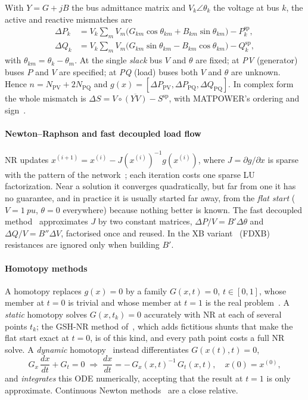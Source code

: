 \documentclass[sigconf,nonacm]{acmart}
\newcommand{\xo}{x^{(0)}}
\begin{document}
With $Y=G+jB$ the bus admittance matrix and $V_k\angle\theta_k$ the voltage at bus $k$, the active and
reactive mismatches are
\begin{align}
  \Delta P_k &= V_k \sum_{m} V_m\bigl(G_{km}\cos\theta_{km} + B_{km}\sin\theta_{km}\bigr) - P_k^{\mathrm{sp}}, \label{eq:p}\\
  \Delta Q_k &= V_k \sum_{m} V_m\bigl(G_{km}\sin\theta_{km} - B_{km}\cos\theta_{km}\bigr) - Q_k^{\mathrm{sp}}, \label{eq:q}
\end{align}
with $\theta_{km}=\theta_k-\theta_m$. At the single \emph{slack} bus $V$ and $\theta$ are fixed; at
\emph{PV} (generator) buses $P$ and $V$ are specified; at \emph{PQ} (load) buses both $V$ and $\theta$
are unknown. Hence $n=N_{\mathrm{PV}}+2N_{\mathrm{PQ}}$ and
$g(x)=[\Delta P_{\mathrm{PV}},\Delta P_{\mathrm{PQ}},\Delta Q_{\mathrm{PQ}}]$. In complex form the whole
mismatch is $\Delta S = V\circ\overline{(YV)} - S^{\mathrm{sp}}$, with MATPOWER's ordering and
sign~\cite{matpower}.

\paragraph{Newton--Raphson and fast decoupled load flow}
NR updates $x^{(i+1)} = x^{(i)} - J(x^{(i)})^{-1} g(x^{(i)})$, where $J=\partial g/\partial x$ is sparse
with the pattern of the network~\cite{tinney1967}; each iteration costs one sparse LU factorization. Near
a solution it converges quadratically, but far from one it has no guarantee, and in practice it is
usually started far away, from the \emph{flat start} ($V=\SI{1}{pu}$, $\theta=0$ everywhere) because
nothing better is known. The fast decoupled method~\cite{stott1974} approximates $J$ by two constant
matrices, $\Delta P/V = B'\Delta\theta$ and $\Delta Q/V = B''\Delta V$, factorised once and reused. In the
XB variant~\cite{vanamerongen1989} (FDXB) resistances are ignored only when building $B'$.

\paragraph{Homotopy methods}
A homotopy replaces $g(x)=0$ by a family $G(x,t)=0$, $t\in[0,1]$, whose member at $t=0$ is trivial and
whose member at $t=1$ is the real problem~\cite{watson1989,allgower2003}. A \emph{static} homotopy solves
$G(x,t_k)=0$ accurately with NR at each of several points $t_k$; the GSH-NR method of~\cite{freitas2022},
which adds fictitious shunts that make the flat start exact at $t=0$, is of this kind, and every path point
costs a full NR solve. A \emph{dynamic} homotopy~\cite{lima2024ijepes} instead differentiates
$G(x(t),t)=0$,
\begin{equation}
  G_x\,\frac{dx}{dt} + G_t = 0
  \;\Longrightarrow\;
  \frac{dx}{dt} = -\,G_x(x,t)^{-1}\,G_t(x,t), \quad x(0)=\xo, \label{eq:ode}
\end{equation}
and \emph{integrates} this ODE numerically, accepting that the result at $t=1$ is only approximate.
Continuous Newton methods~\cite{milano2009} are a close relative.
\end{document}
